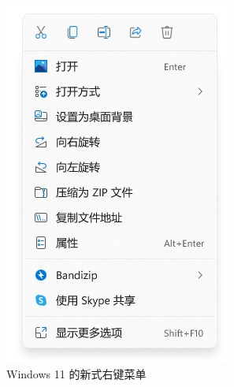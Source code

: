 \begin{figure}[htb!]
  \centering
  \begin{minipage}{.45\textwidth}
    \centering
    \includegraphics[width=.9\textwidth]{assets/advanced/Windows11_Right_click.jpg}
    \caption{Windows 11 的新式右键菜单}
    \label{fig:Windows11_Right_click}
  \end{minipage}
  \begin{minipage}{.54\textwidth}
    \centering

\end{minipage}
\end{figure}
